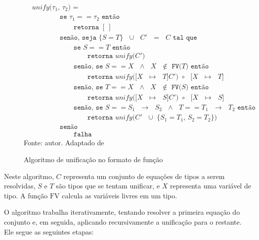 \begin{figure}[ht!]
  \caption{Algoritmo de unificação no formato de função}
  \centering
  \begin{align*}
    & \texttt{$unify$($\tau_1$, $\tau_2$) =} \\
    & \qquad{}\qquad{}\texttt{se $\tau_1 == \tau_2$ então} \\
    & \qquad{}\qquad{}\qquad{}\texttt{retorna $[\ ]$} \\
    & \qquad{}\qquad{}\texttt{senão, seja $\{ S = T \}$ $\cup$ $C'$ $=$ $C$ tal que} \\
    & \qquad{}\qquad{}\qquad{}\texttt{se $S == T$ então} \\
    & \qquad{}\qquad{}\qquad{}\qquad{}\texttt{retorna $unify$($C'$)} \\
    & \qquad{}\qquad{}\qquad{}\texttt{senão, se $S == X$ $\land$ $X$ $\notin$ FV($T$) então} \\
    & \qquad{}\qquad{}\qquad{}\qquad{}\texttt{retorna $unify$($[X$ $\mapsto$ $T]C'$) $\circ$ $[X$ $\mapsto$ $T]$} \\
    & \qquad{}\qquad{}\qquad{}\texttt{senão, se $T == X$ $\land$ $X$ $\notin$ FV($S$) então} \\
    & \qquad{}\qquad{}\qquad{}\qquad{}\texttt{retorna $unify$($[X$ $\mapsto$ $S]C'$) $\circ$ $[X$ $\mapsto$ $S]$} \\
    & \qquad{}\qquad{}\qquad{}\texttt{senão, se $S == S_1$ $\to$ $S_2$ $\land$ $T == T_1$ $\to$ $T_2$ então}\\
    & \qquad{}\qquad{}\qquad{}\qquad{}\texttt{retorna $unify$($C'$ $\cup$ \{$S_1 = T_1$,\ $S_2 = T_2$\})} \\
    & \qquad{}\qquad{}\texttt{senão} \\
    & \qquad{}\qquad{}\qquad{}\texttt{falha}
  \end{align*}
  \small{Fonte: autor. Adaptado de~\cite{PIERCE2002}}\label{fig:unify-algo}
\end{figure}

Neste algoritmo, $C$ representa um conjunto de equações de tipos a serem resolvidas, $S$ e $T$ são tipos que se tentam unificar, e $X$ representa uma variável de tipo.
A função $\text{FV}$ calcula as variáveis livres em um tipo.

O algoritmo trabalha iterativamente, tentando resolver a primeira equação do conjunto e, em seguida, aplicando recursivamente a unificação para o restante.
Ele segue as seguintes etapas:


